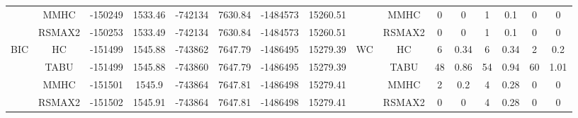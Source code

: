 \begin{table}[p]
{\begin{tabular}{cc||cc|cc|cc||cc|cc|cc|cc}
& MMHC &	-150249 & 	1533.46 & 	-742134 & 	7630.84 & 	-1484573 & 	15260.51 & 	& MMHC &	0 & 	0 & 	1 & 	0.1 & 	0 & 	0\tabularnewline													
& RSMAX2 &	-150253 & 	1533.49 & 	-742134 & 	7630.84 & 	-1484573 & 	15260.51 & 	& RSMAX2 &	0 & 	0 & 	1 & 	0.1 & 	0 & 	0\tabularnewline													
\hline																										
\multirow{4}{*}{BIC} & HC &	-151499 & 	1545.88 & 	-743862 & 	7647.79 & 	-1486495 & 	15279.39 & 	\multirow{4}{*}{WC} & HC &	6 & 	0.34 & 	6 & 	0.34 & 	2 & 	0.2\tabularnewline													
& TABU &	-151499 & 	1545.88 & 	-743860 & 	7647.79 & 	-1486495 & 	15279.39 & 	& TABU &	48 & 	0.86 & 	54 & 	0.94 & 	60 & 	1.01\tabularnewline													
& MMHC &	-151501 & 	1545.9 & 	-743864 & 	7647.81 & 	-1486498 & 	15279.41 & 	& MMHC &	2 & 	0.2 & 	4 & 	0.28 & 	0 & 	0\tabularnewline													
& RSMAX2 &	-151502 & 	1545.91 & 	-743864 & 	7647.81 & 	-1486498 & 	15279.41 & 	& RSMAX2 &	0 & 	0 & 	4 & 	0.28 & 	0 & 	0\tabularnewline													
\hline																										
\end{tabular}																										
}																										
\end{table}																										




